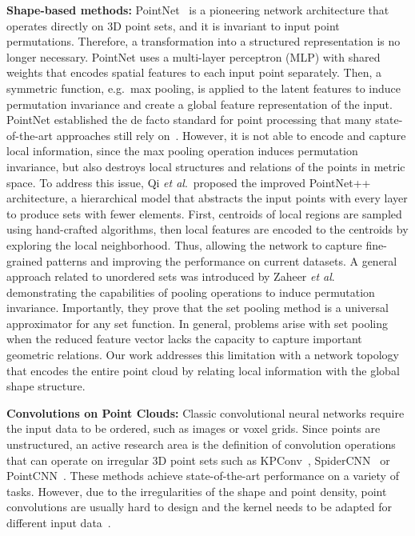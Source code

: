 \documentclass{ieeeaccess}
\begin{document}
\textbf{Shape-based methods:} PointNet~\cite{qi2017pointnet} is a pioneering network architecture that operates directly on 3D point sets, and it is invariant to input point permutations. Therefore, a transformation into a structured representation is no longer necessary.
PointNet uses a multi-layer perceptron (MLP) with shared weights that encodes spatial features to each input point separately. Then, a symmetric function, e.g.~max pooling, is applied to the latent features to induce permutation invariance and create a global feature representation of the input. PointNet established the de facto standard for point processing that many state-of-the-art approaches still rely on~\cite{lang2019pointpillars,qi2018frustum}. However, it is not able to encode and capture local information, since the max pooling operation induces permutation invariance, but also destroys local structures and relations of the points in metric space. To address this issue, Qi \textit{et al}.~proposed the improved PointNet++~\cite{qi2017pointnet++} architecture, a hierarchical model that abstracts the input points with every layer to produce sets with fewer elements. First, centroids of local regions are sampled using hand-crafted algorithms, then local features are encoded to the centroids by exploring the local neighborhood. Thus, allowing the network to capture fine-grained patterns and improving the performance on current datasets.
A general approach related to unordered sets was introduced by Zaheer \textit{et al}.~\cite{zaheer2017deep} demonstrating the capabilities of pooling operations to induce permutation invariance. Importantly, they prove that the set pooling method is a universal approximator for any set function. In general, problems arise with set pooling when the reduced feature vector lacks the capacity to capture important geometric relations. Our work addresses this limitation with a network topology that encodes the entire point cloud by relating local information with the global shape structure.

\textbf{Convolutions on Point Clouds:} Classic convolutional neural networks require the input data to be ordered, such as images or voxel grids. Since points are unstructured, an active research area is the definition of convolution operations that can operate on irregular 3D point sets such as KPConv~\cite{thomas2019kpconv}, SpiderCNN~\cite{xu2018spidercnn} or PointCNN~\cite{li2018pointcnn}. These methods achieve state-of-the-art performance on a variety of tasks. However, due to the irregularities of the shape and point density, point convolutions are usually hard to design and the kernel needs to be adapted for different input data~\cite{guo2020deep}.
\end{document}
